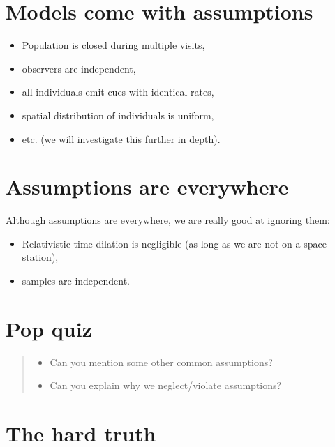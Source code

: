\documentclass[12pt,]{scrbook}
\providecommand{\tightlist}{%
  \setlength{\itemsep}{0pt}\setlength{\parskip}{0pt}}
\begin{document}
\hypertarget{models-come-with-assumptions}{%
\section{Models come with assumptions}\label{models-come-with-assumptions}}

\begin{itemize}
\tightlist
\item
  Population is closed during multiple visits,
\item
  observers are independent,
\item
  all individuals emit cues with identical rates,
\item
  spatial distribution of individuals is uniform,
\item
  etc. (we will investigate this further in depth).
\end{itemize}

\hypertarget{assumptions-are-everywhere}{%
\section{Assumptions are everywhere}\label{assumptions-are-everywhere}}

Although assumptions are everywhere, we are really good at ignoring them:

\begin{itemize}
\tightlist
\item
  Relativistic time dilation is negligible (as long as we are not on a space station),
\item
  samples are independent.
\end{itemize}

\hypertarget{pop-quiz-1}{%
\section{Pop quiz}\label{pop-quiz-1}}

\begin{quote}
\begin{itemize}
\tightlist
\item
  Can you mention some other common assumptions?
\item
  Can you explain why we neglect/violate assumptions?
\end{itemize}
\end{quote}

\hypertarget{the-hard-truth}{%
\section{The hard truth}\label{the-hard-truth}}
\end{document}
